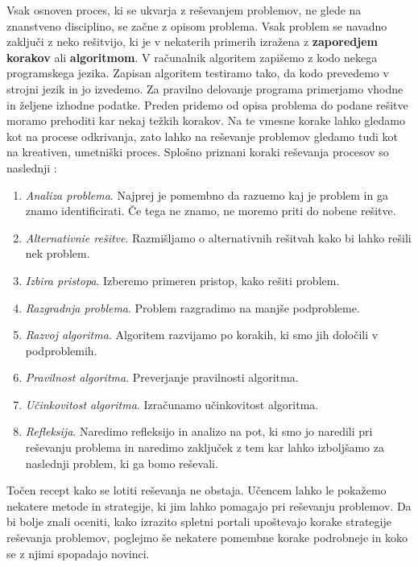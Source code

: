
Vsak osnoven proces, ki se ukvarja z reševanjem problemov, ne glede na
znanstveno disciplino, se začne z opisom problema. Vsak problem se
navadno zaključi z neko rešitvijo, ki je v nekaterih primerih izražena
z \textbf{zaporedjem korakov} ali \textbf{algoritmom}. V računalnik
algoritem zapišemo z kodo nekega programskega jezika. Zapisan
algoritem testiramo tako, da kodo prevedemo v strojni jezik in jo
izvedemo. Za pravilno delovanje programa primerjamo vhodne in željene
izhodne podatke. Preden pridemo od opisa problema do podane rešitve
moramo prehoditi kar nekaj težkih korakov. Na te vmesne korake lahko
gledamo kot na procese odkrivanja, zato lahko na reševanje problemov
gledamo tudi kot na kreativen, umetniški proces. Splošno priznani
koraki reševanja procesov so naslednji \cite{guideTCS}:

\begin{enumerate}
\tightlist
\item \emph{Analiza problema}. Najprej je pomembno da razuemo kaj je
  problem in ga znamo identificirati. Če tega ne znamo, ne moremo
  priti do nobene rešitve.
\item \emph{Alternativnie rešitve}. Razmišljamo o alternativnih
  rešitvah kako bi lahko rešili nek problem.
\item \emph{Izbira pristopa}. Izberemo primeren pristop, kako rešiti problem.
\item \emph{Razgradnja problema}. Problem razgradimo na manjše podprobleme.
\item \emph{Razvoj algoritma}. Algoritem razvijamo po korakih, ki smo
  jih določili v podproblemih.
\item \emph{Pravilnost algoritma}. Preverjanje pravilnosti algoritma.
\item \emph{Učinkovitost algoritma}. Izračunamo učinkovitost algoritma.
\item \emph{Refleksija}. Naredimo refleksijo in analizo na pot, ki smo
  jo naredili pri reševanju problema in naredimo zaključek z tem kar
  lahko izboljšamo za naslednji problem, ki ga bomo reševali.
\end{enumerate}

Točen recept kako se lotiti reševanja ne obstaja. Učencem lahko le
pokažemo nekatere metode in strategije, ki jim lahko pomagajo pri
reševanju problemov. Da bi bolje znali oceniti, kako izrazito spletni
portali upoštevajo korake strategije reševanja problemov, poglejmo še
nekatere pomembne korake podrobneje in koko se z njimi spopadajo
novinci.

